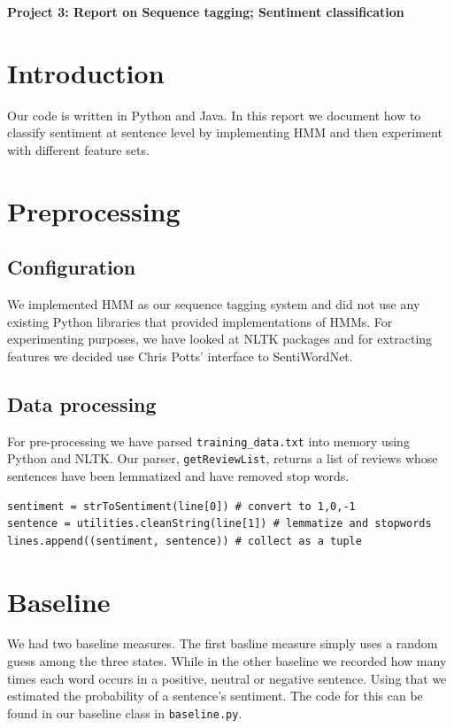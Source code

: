 \documentclass{article}
\begin{document}
\begin{center}\textbf{Project 3: Report on Sequence tagging; Sentiment classification}\end{center}


\section{Introduction}
Our code is written in Python and Java. In this report we document how to classify sentiment at sentence level by implementing HMM and then experiment with different feature sets.


\section{Preprocessing}

\subsection{Configuration}
We implemented HMM as our sequence tagging system and did not use any existing Python libraries that provided implementations of HMMs. For experimenting purposes, we have looked at NLTK packages and for extracting features we decided use Chris Potts' interface to SentiWordNet.


\subsection{Data processing}
For pre-processing we have parsed \texttt{training\_data.txt} into memory using Python and NLTK. Our parser, \texttt{getReviewList}, returns a list of reviews whose sentences have been lemmatized and have removed stop words.

\begin{verbatim}
sentiment = strToSentiment(line[0]) # convert to 1,0,-1
sentence = utilities.cleanString(line[1]) # lemmatize and stopwords
lines.append((sentiment, sentence)) # collect as a tuple
\end{verbatim}


\section{Baseline}
We had two baseline measures. The first basline measure simply uses a random guess among the three states. While in the other baseline we recorded how many times each word occurs in a positive, neutral or negative sentence. Using that we estimated the probability of a sentence's sentiment. The code for this can be found in our baseline class in \texttt{baseline.py}.
\end{document}

